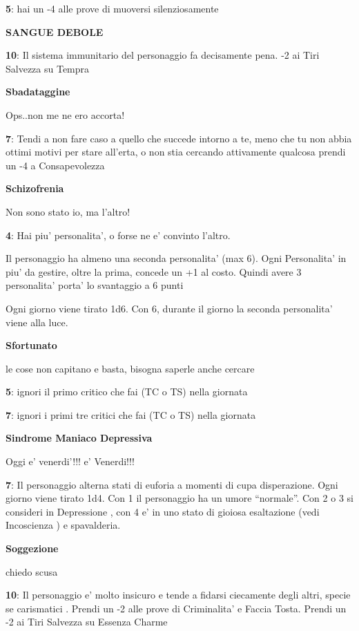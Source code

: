 \documentclass[a4paper,11pt,twoside,openany]{dndbook}
\begin{document}
{\textbf{5}: hai un -4 alle prove di muoversi silenziosamente

\textbf{SANGUE DEBOLE}

\textbf{10}: Il sistema immunitario del personaggio fa decisamente pena. -2 ai Tiri Salvezza su Tempra

\textbf{Sbadataggine}

Ops..non me ne ero accorta!

\textbf{7}: Tendi a non fare caso a quello che succede intorno a te, meno che tu non abbia ottimi motivi per stare all'erta, o non stia cercando attivamente qualcosa prendi un -4 a Consapevolezza

\textbf{Schizofrenia}

Non sono stato io, ma l'altro!

\textbf{4}: Hai piu' personalita', o forse ne e' convinto l'altro.

Il personaggio ha almeno una seconda personalita' (max 6).
Ogni Personalita' in piu' da gestire, oltre la prima, concede un +1 al costo.
Quindi avere 3 personalita' porta' lo svantaggio a 6 punti

Ogni giorno viene tirato 1d6. Con 6, durante il giorno la seconda personalita' viene alla luce.

\textbf{Sfortunato}

le cose non capitano e basta, bisogna saperle anche cercare

\textbf{5}: ignori il primo critico che fai (TC o TS) nella giornata

\textbf{7}: ignori i primi tre critici che fai (TC o TS) nella giornata

\textbf{Sindrome Maniaco Depressiva}

Oggi e' venerdi'!!! e' Venerdi!!!

\textbf{7}: Il personaggio alterna stati di euforia a momenti di cupa disperazione. Ogni giorno viene tirato 1d4. Con 1 il personaggio ha un umore ``normale''. Con 2 o 3 si consideri in Depressione , con 4 e' in uno stato di gioiosa esaltazione (vedi Incoscienza ) e spavalderia.

\textbf{Soggezione}

chiedo scusa

\textbf{10}: Il personaggio e' molto insicuro e tende a fidarsi ciecamente degli altri, specie se carismatici . Prendi un -2 alle prove di Criminalita' e Faccia Tosta.
Prendi un -2 ai Tiri Salvezza su Essenza Charme

}
\end{document}
